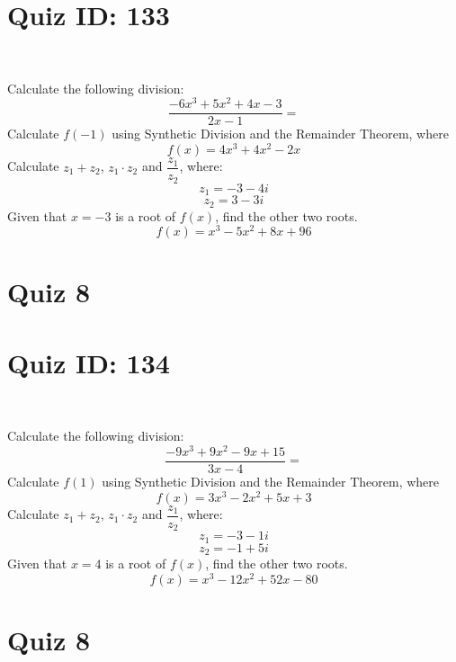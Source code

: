 \documentclass{exam}
\begin{document}
\section*{Quiz ID: 133}
\vspace{0.5cm}\
\vspace{1cm}\
\begin{questions}
\question Calculate the following division:\[\dfrac{
-6x^3 + 5x^2 + 4x - 3}{
2x - 1}=\] \makeemptybox{\stretch{2}}
\question Calculate $f(-1)$ using Synthetic Division and the Remainder Theorem, where\[f(x) = 
4x^3 + 4x^2 - 2x\]
\newpage\question Calculate $z_1+z_2$, $z_1\cdot z_2$ and $\dfrac{z_1}{z_2}$, where:\[z_1=-3-4\mathit{i}\]\[z_2=3-3\mathit{i}\]
\question Given that $x=-3$ is a root of $f(x)$, find the other two roots.\[f(x)=
x^3 - 5x^2 + 8x + 96\]\makeemptybox{\stretch{1}}
\end{questions}\newpage
\newpage
\section*{Quiz 8}
\section*{Quiz ID: 134}
\vspace{0.5cm}\
\vspace{1cm}\
\begin{questions}
\question Calculate the following division:\[\dfrac{
-9x^3 + 9x^2 - 9x + 15}{
3x - 4}=\] 
\question Calculate $f(1)$ using Synthetic Division and the Remainder Theorem, where\[f(x) = 
3x^3 - 2x^2 + 5x + 3\]
\newpage\question Calculate $z_1+z_2$, $z_1\cdot z_2$ and $\dfrac{z_1}{z_2}$, where:\[z_1=-3-1\mathit{i}\]\[z_2=-1+5\mathit{i}\]\makeemptybox{\stretch{1}}
\question Given that $x=4$ is a root of $f(x)$, find the other two roots.\[f(x)=
x^3 - 12x^2 + 52x - 80\]\makeemptybox{\stretch{1}}
\end{questions}\newpage
\newpage
\section*{Quiz 8}
\end{document}

